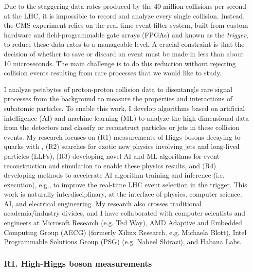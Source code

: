 \documentclass[11pt,letterpaper,notitlepage]{article}
\begin{document}
Due to the staggering data rates produced by the 40 million collisions per second at the LHC, it is impossible to record and analyze every single collision.
Instead, the CMS experiment relies on the real-time event filter system, built from custom hardware and field-programmable gate arrays (FPGAs) and known as the \emph{trigger}, to reduce these data rates to a manageable level.
A crucial constraint is that the decision of whether to save or discard an event must be made in less than about 10 microseconds.
The main challenge is to do this reduction without rejecting collision events resulting from rare processes that we would like to study.

I analyze petabytes of proton-proton collision data to disentangle rare signal processes from the background to measure the properties and interactions of subatomic particles.
To enable this work, I develop algorithms based on artificial intelligence (AI) and machine learning (ML) to analyze the high-dimensional data from the detectors and classify or reconstruct particles or jets in these collision events.
My research focuses on
(R1) measurements of Higgs bosons decaying to quarks with \pt,
(R2) searches for exotic new physics involving jets and long-lived particles (LLPs),
(R3) developing novel AI and ML algorithms for event reconstruction and simulation to enable these physics results, and
(R4) developing methods to accelerate AI algorithm training and inference (i.e. execution), e.g., to improve the real-time LHC event selection in the trigger.
This work is naturally interdisciplinary, at the interface of physics, computer science, AI, and electrical engineering.
My research also crosses traditional academia/industry divides, and I have collaborated with computer scientists and engineers at Microsoft Research (e.g. Ted Way), AMD Adaptive and Embedded Computing Group (AECG) (formerly Xilinx Research, e.g. Michaela Blott), Intel Programmable Solutions Group (PSG) (e.g. Nabeel Shirazi), and Habana Labs.

\vspace{-1ex}
\subsubsection*{R1. High-\pt Higgs boson measurements}
\end{document}
